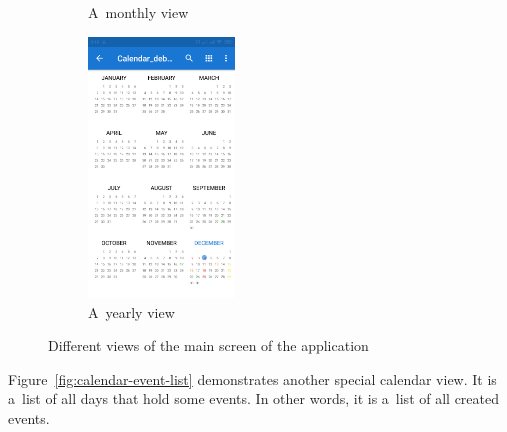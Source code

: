 \documentclass[a4paper, 11pt]{article}
\begin{document}
\begin{figure}[H]
\begin{subfigure}{.24 \textwidth}
			\caption{A~monthly view}
		\end{subfigure}
%
		\begin{subfigure}{.24 \textwidth}
			\centering
			\includegraphics[width=10.5em, frame]{img/calendar_year.png}
			\caption{A~yearly view}
		\end{subfigure}

		\caption{Different views of the main screen of the application}
		\label{fig:calendar-views}
	\end{figure}

	Figure~\ref{fig:calendar-event-list} demonstrates another special
	calendar view. It is a~list of all days that hold some events. In
	other words, it is a~list of all created events.
\end{document}

